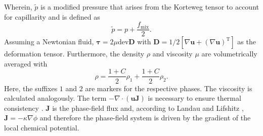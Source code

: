 Wherein, $\tilde{p}$ is a modified pressure that arises from the Korteweg tensor to account for capillarity and is defined as
\begin{equation}
    \tilde{p} = p + \frac{f_{\mathrm{mix}}}{2}.
\end{equation}
Assuming a Newtonian fluid, $\mathbf{\tau} = 2\mu \mathrm{dev}\mathbf{D}$ with $\mathbf{D} = 1/2[\nabla \mathbf{u}+(\nabla \mathbf{u})^{\mathrm{T}}]$ as the deformation tensor. Furthermore, the density $\rho$ and viscosity $\mu$ are volumetrically averaged with 
\begin{equation}
    \rho = \frac{1 + C}{2} \rho_1 +\frac{1 + C}{2} \rho_2.
\end{equation} 
Here, the suffixes $1$ and $2$ are markers for the respective phases. The viscosity is calculated analogously. The term $- \nabla \cdot(\mathbf{u}\mathbf{J})$ is necessary to ensure thermal consistency \cite{ding2007DiffuseInterfaceModel}. $\mathbf{J}$ is the phase-field flux and, according to Landau and Lifshitz , $\mathbf{J} = -\kappa \nabla \phi$ and therefore the phase-field system is driven by the gradient of the local chemical potential. 


